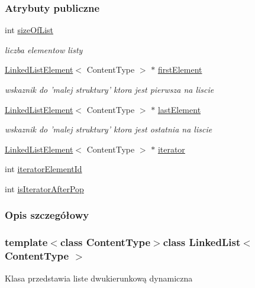 \subsubsection*{Atrybuty publiczne}
\begin{DoxyCompactItemize}
\item 
int \hyperlink{class_linked_list_acfd83fe531d962d6260a633dfca98a9f}{size\-Of\-List}
\begin{DoxyCompactList}\small\item\em liczba elementow listy \end{DoxyCompactList}\item 
\hyperlink{class_linked_list_element}{Linked\-List\-Element}$<$ Content\-Type $>$ $\ast$ \hyperlink{class_linked_list_a51c0816c49528a63eea2adae2d503ada}{first\-Element}
\begin{DoxyCompactList}\small\item\em wskaznik do 'malej struktury' ktora jest pierwsza na liscie \end{DoxyCompactList}\item 
\hyperlink{class_linked_list_element}{Linked\-List\-Element}$<$ Content\-Type $>$ $\ast$ \hyperlink{class_linked_list_a8ca0cc6c38131c17f1626bb04a472fc9}{last\-Element}
\begin{DoxyCompactList}\small\item\em wskaznik do 'malej struktury' ktora jest ostatnia na liscie \end{DoxyCompactList}\item 
\hyperlink{class_linked_list_element}{Linked\-List\-Element}$<$ Content\-Type $>$ $\ast$ \hyperlink{class_linked_list_a6f117a991b3e2e020f43807500b45f5f}{iterator}
\item 
int \hyperlink{class_linked_list_a6398cec56a986426925e4e651bc4725c}{iterator\-Element\-Id}
\item 
int \hyperlink{class_linked_list_a8d354ba516e8270027bf617b121b49fe}{is\-Iterator\-After\-Pop}
\end{DoxyCompactItemize}


\subsubsection{Opis szczegółowy}
\subsubsection*{template$<$class Content\-Type$>$class Linked\-List$<$ Content\-Type $>$}

Klasa przedstawia liste dwukierunkową dynamiczna 

